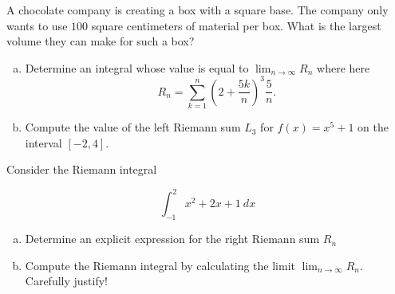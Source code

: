 \documentclass[11pt]{exam}
\theoremstyle{definition}
\begin{document}
\begin{questions}
\newpage
\question[10]\mbox{}

A chocolate company is creating a box with a square base.
The company only wants to use $100$ square centimeters of material per box.
What is the largest volume they can make for such a box?



\newpage
\question[10]\mbox{}

\begin{enumerate}[(a)]
\item  Determine an integral whose value is equal to $\lim_{n\rightarrow\infty} R_n$ where here
$$R_n = \sum_{k=1}^n \left(2 + \frac{5k}{n}\right)^3 \frac{5}{n}.$$
\vspace{3in}
\item  Compute the value of the left Riemann sum $L_3$ for $f(x) = x^5+1$ on the interval $[-2,4]$.
\end{enumerate}

\newpage
\question[10]\mbox{}

Consider the Riemann integral

$$\int_{-1}^2 x^2 + 2x + 1\ dx$$

\begin{enumerate}[(a)]
\item  Determine an explicit expression for the right Riemann sum $R_n$
\vspace{4in}
\item  Compute the Riemann integral by calculating the limit $\lim_{n\rightarrow\infty} R_n$.  Carefully justify!
\end{enumerate}



\end{questions}
\end{document}
